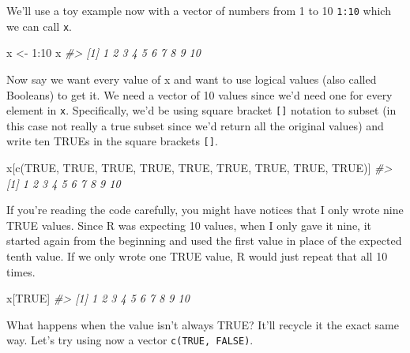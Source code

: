 \documentclass[
]{krantz}
\makeatletter
\newenvironment{Shaded}{\begin{snugshade}}{\end{snugshade}}
\newcommand{\CommentTok}[1]{\textcolor[rgb]{0.37,0.37,0.37}{\textit{#1}}}
\newcommand{\ConstantTok}[1]{\textcolor[rgb]{0,0,0}{#1}}
\newcommand{\DecValTok}[1]{\textcolor[rgb]{0.06,0.06,0.06}{#1}}
\newcommand{\FunctionTok}[1]{\textcolor[rgb]{0,0,0}{#1}}
\newcommand{\NormalTok}[1]{#1}
\newcommand{\OtherTok}[1]{\textcolor[rgb]{0.37,0.37,0.37}{#1}}
\newcommand{\SpecialCharTok}[1]{\textcolor[rgb]{0,0,0}{#1}}
\newenvironment{kframe}{%
\medskip{}
\setlength{\fboxsep}{.8em}
 \def\at@end@of@kframe{}%
 \ifinner\ifhmode%
  \def\at@end@of@kframe{\end{minipage}}%
  \begin{minipage}{\columnwidth}%
 \fi\fi%
 \def\FrameCommand##1{\hskip\@totalleftmargin \hskip-\fboxsep
 \colorbox{shadecolor}{##1}\hskip-\fboxsep
     \hskip-\linewidth \hskip-\@totalleftmargin \hskip\columnwidth}%
 \MakeFramed {\advance\hsize-\width
   \@totalleftmargin\z@ \linewidth\hsize
   \@setminipage}}%
 {\par\unskip\endMakeFramed%
 \at@end@of@kframe}
\renewenvironment{Shaded}{\begin{kframe}}{\end{kframe}}
\makeatother
\begin{document}
We'll use a toy example now with a vector of numbers from 1 to 10 \texttt{1:10} which we can call \texttt{x}.

\begin{Shaded}
\begin{Highlighting}[]
\NormalTok{x }\OtherTok{\textless{}{-}} \DecValTok{1}\SpecialCharTok{:}\DecValTok{10}
\NormalTok{x}
\CommentTok{\#\textgreater{}  [1]  1  2  3  4  5  6  7  8  9 10}
\end{Highlighting}
\end{Shaded}

Now say we want every value of x and want to use logical values (also called Booleans) to get it. We need a vector of 10 values since we'd need one for every element in \texttt{x}. Specifically, we'd be using square bracket \texttt{{[}{]}} notation to subset (in this case not really a true subset since we'd return all the original values) and write ten TRUEs in the square brackets \texttt{{[}{]}}.

\begin{Shaded}
\begin{Highlighting}[]
\NormalTok{x[}\FunctionTok{c}\NormalTok{(}\ConstantTok{TRUE}\NormalTok{, }\ConstantTok{TRUE}\NormalTok{, }\ConstantTok{TRUE}\NormalTok{, }\ConstantTok{TRUE}\NormalTok{, }\ConstantTok{TRUE}\NormalTok{, }\ConstantTok{TRUE}\NormalTok{, }\ConstantTok{TRUE}\NormalTok{, }\ConstantTok{TRUE}\NormalTok{, }\ConstantTok{TRUE}\NormalTok{)]}
\CommentTok{\#\textgreater{}  [1]  1  2  3  4  5  6  7  8  9 10}
\end{Highlighting}
\end{Shaded}

If you're reading the code carefully, you might have notices that I only wrote nine TRUE values. Since R was expecting 10 values, when I only gave it nine, it started again from the beginning and used the first value in place of the expected tenth value. If we only wrote one TRUE value, R would just repeat that all 10 times.

\begin{Shaded}
\begin{Highlighting}[]
\NormalTok{x[}\ConstantTok{TRUE}\NormalTok{]}
\CommentTok{\#\textgreater{}  [1]  1  2  3  4  5  6  7  8  9 10}
\end{Highlighting}
\end{Shaded}

What happens when the value isn't always TRUE? It'll recycle it the exact same way. Let's try using now a vector \texttt{c(TRUE,\ FALSE)}.
\end{document}
